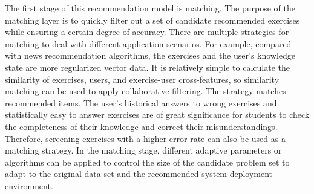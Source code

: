 The first stage of this recommendation model is matching. The purpose of the matching layer is to quickly filter out a set of candidate recommended exercises while ensuring a certain degree of accuracy. There are multiple strategies for matching to deal with different application scenarios. For example, compared with news recommendation algorithms, the exercises and the user's knowledge state are more regularized vector data. It is relatively simple to calculate the similarity of exercises, users, and exercise-user cross-features, so similarity matching can be used to apply collaborative filtering. The strategy matches recommended items. The user's historical answers to wrong exercises and statistically easy to answer exercises are of great significance for students to check the completeness of their knowledge and correct their misunderstandings. Therefore, screening exercises with a higher error rate can also be used as a matching strategy. In the matching stage, different adaptive parameters or algorithms can be applied to control the size of the candidate problem set to adapt to the original data set and the recommended system deployment environment.

